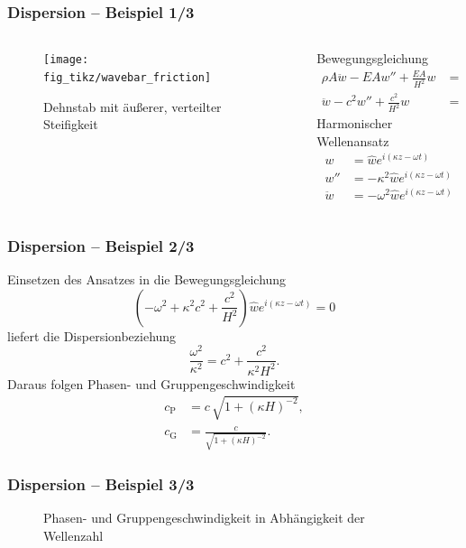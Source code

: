 \begin{frame}
\frametitle{Dispersion -- Beispiel 1/3} 
\begin{columns}
  \begin{column}[t]{.6\linewidth}
    \begin{figure}
      \texttt{[image: fig\_tikz/wavebar\_friction]}
      \caption*{Dehnstab mit äußerer, verteilter Steifigkeit~\cite{Verruijt2010}}
    \end{figure}   
  \end{column}
\begin{column}[t]{.4\linewidth}
Bewegungsgleichung
   \begin{align*}
    \rho A \ddot{w}-EAw''+\frac{EA}{H^2}w &= 0 \\
    \ddot{w}-c^2w''+\frac{c^2}{H^2}w &= 0
   \end{align*}
   Harmonischer Wellenansatz
   \begin{align*}
    w&=\hat{w}e^{i(\kappa z-\omega t)}\\
    w''&=-\kappa^2 \hat{w}e^{i(\kappa z-\omega t)}\\
    \ddot{w}&=-\omega^2 \hat{w}e^{i(\kappa z-\omega t)}
   \end{align*}
  \end{column}
\end{columns}
\end{frame}

\begin{frame}
\frametitle{Dispersion -- Beispiel 2/3} 
Einsetzen des Ansatzes in die Bewegungsgleichung
\begin{equation*}
 \left(-\omega^2+\kappa^2 c^2+\frac{c^2}{H^2} \right)\hat{w}e^{i(\kappa z-\omega t)}=0 
\end{equation*}
 liefert die Dispersionbeziehung
\begin{equation*}
 \frac{\omega^2}{\kappa^2}=c^2+\frac{c^2}{\kappa^2 H^2}.
\end{equation*}
Daraus folgen Phasen- und Gruppengeschwindigkeit
\begin{align*}
 c_\mathrm{P}&=c\,\sqrt{1+(\kappa H)^{-2}}, \\
 c_\mathrm{G}&=\frac{c}{\sqrt{1+(\kappa H)^{-2}}}.
\end{align*}
\end{frame}

\begin{frame}
\frametitle{Dispersion -- Beispiel 3/3} 
\begin{figure}

\caption*{Phasen- und Gruppengeschwindigkeit in Abhängigkeit der Wellenzahl}
\end{figure}
\end{frame}

